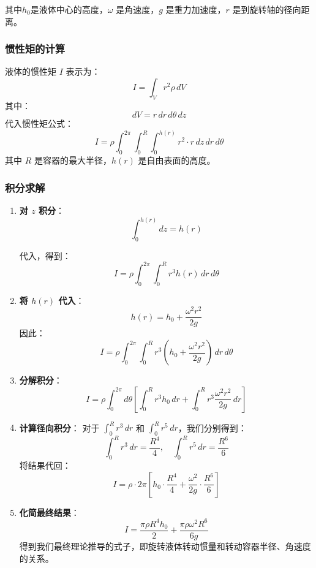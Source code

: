 \documentclass[12pt,hyperref,a4paper,UTF8]{ctexart}
\begin{document}
        其中$h_0$是液体中心的高度，$\omega$ 是角速度，$g$ 是重力加速度，$r$ 是到旋转轴的径向距离。
        
        \subsubsection{惯性矩的计算}
        
        液体的惯性矩 $I$ 表示为：  
        $$
        I = \int_V r^2 \rho \, dV
        $$  
        其中：  
        $$
        dV = r \, dr \, d\theta \, dz
        $$  
        代入惯性矩公式：  
        $$
        I = \rho \int_0^{2\pi} \int_0^{R} \int_0^{h(r)} r^2 \cdot r \, dz \, dr \, d\theta
        $$  
        其中 $R$ 是容器的最大半径，$h(r)$ 是自由表面的高度。
        
        \subsubsection{积分求解}
        \begin{enumerate}
        \item \textbf{对 $z$ 积分}：  
        $$
        \int_0^{h(r)} dz = h(r)
        $$  
        
        代入，得到：  
        $$
        I = \rho \int_0^{2\pi} \int_0^{R} r^3 h(r) \, dr \, d\theta
        $$  
        
        \item \textbf{将 $h(r)$ 代入}：  
        $$
        h(r) = h_0 + \frac{\omega^2 r^2}{2g}
        $$  
        因此：  
        $$
        I = \rho \int_0^{2\pi} \int_0^{R} r^3 \left( h_0 + \frac{\omega^2 r^2}{2g} \right) \, dr \, d\theta
        $$  
        
        \item \textbf{分解积分}：  
        $$
        I = \rho \int_0^{2\pi} d\theta \left[ \int_0^{R} r^3 h_0 \, dr + \int_0^{R} r^3 \frac{\omega^2 r^2}{2g} \, dr \right]
        $$  
        
        \item \textbf{计算径向积分}：  
        对于 $\int_0^R r^3 \, dr$ 和 $\int_0^R r^5 \, dr$，我们分别得到：  
        $$
        \int_0^R r^3 \, dr = \frac{R^4}{4}, \quad \int_0^R r^5 \, dr = \frac{R^6}{6}
        $$  
        将结果代回：  
        $$
        I = \rho \cdot 2\pi \left[ h_0 \cdot \frac{R^4}{4} + \frac{\omega^2}{2g} \cdot \frac{R^6}{6} \right]
        $$  
        
        \item \textbf{化简最终结果}：  
        $$
        I = \frac{\pi \rho R^4 h_0}{2} + \frac{\pi \rho \omega^2 R^6}{6g}
        $$  
        得到我们最终理论推导的式子，即旋转液体转动惯量和转动容器半径、角速度的关系。
        \end{enumerate}
\end{document}

